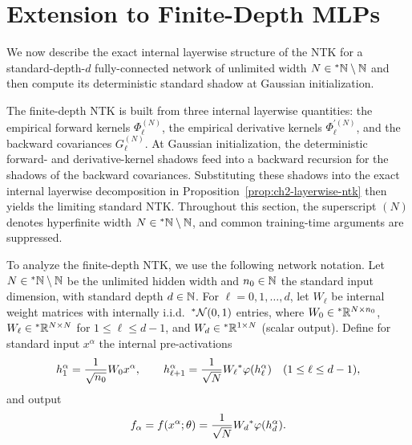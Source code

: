 \section{Extension to Finite-Depth MLPs}\label{sec:ch2-deep-ntk}

We now describe the exact internal layerwise structure of the NTK for a standard-depth-$d$ fully-connected network of unlimited width $N \in {}^*\mathbb{N} \setminus \mathbb{N}$ and then compute its deterministic standard shadow at Gaussian initialization.

The finite-depth NTK is built from three internal layerwise quantities: the empirical forward kernels $\Phi_\ell^{(N)}$, the empirical derivative kernels $\Phi_\ell^{\prime(N)}$, and the backward covariances $G_\ell^{(N)}$. At Gaussian initialization, the deterministic forward- and derivative-kernel shadows feed into a backward recursion for the shadows of the backward covariances. Substituting these shadows into the exact internal layerwise decomposition in Proposition~\ref{prop:ch2-layerwise-ntk} then yields the limiting standard NTK. Throughout this section, the superscript $(N)$ denotes hyperfinite width $N \in {}^*\mathbb{N} \setminus \mathbb{N}$, and common training-time arguments are suppressed.

To analyze the finite-depth NTK, we use the following network notation. Let $N \in {}^*\mathbb{N} \setminus \mathbb{N}$ be the unlimited hidden width and $n_0 \in \mathbb{N}$ the standard input dimension, with standard depth $d \in \mathbb{N}$. For $\ell = 0, 1, \dots, d$, let $W_\ell$ be internal weight matrices with internally i.i.d.\ ${}^*\mathcal{N}(0, 1)$ entries, where $W_0 \in {}^*\mathbb{R}^{N \times n_0}$, $W_\ell \in {}^*\mathbb{R}^{N \times N}$ for $1 \le \ell \le d-1$, and $W_d \in {}^*\mathbb{R}^{1 \times N}$ (scalar output). Define for standard input $x^\alpha$ the internal pre-activations
\begin{equation}\label{eq:ch2-deep-ntk-preact}
h_1^\alpha = \frac{1}{\sqrt{n_0}} W_0 x^\alpha, \qquad h_{\ell+1}^\alpha = \frac{1}{\sqrt{N}} W_\ell {}^*\varphi(h_\ell^\alpha) \quad (1 \le \ell \le d-1),
\end{equation}
and output
\begin{equation}\label{eq:ch2-deep-ntk-out}
f_\alpha = f(x^\alpha; \theta) = \frac{1}{\sqrt{N}} W_d {}^*\varphi(h_d^\alpha).
\end{equation}

